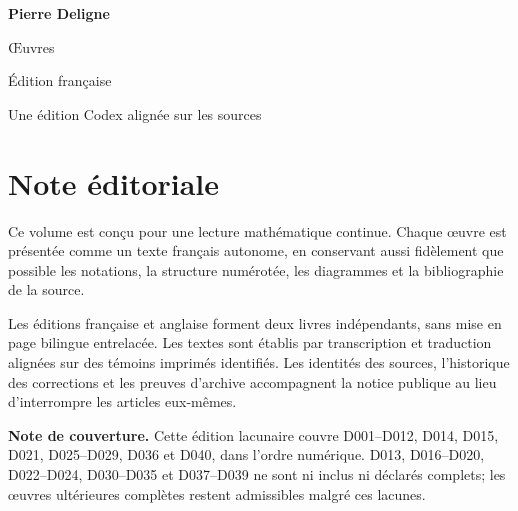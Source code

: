 \documentclass[11pt,a4paper]{article}
\begin{document}
\begin{titlepage}
  \pagecolor{DeligneBlue}
  \color{white}
  \vspace*{34mm}
  {\fontsize{30}{36}\selectfont\bfseries Pierre Deligne\par}
  \vspace{7mm}
  {\fontsize{18}{23}\selectfont Œuvres\par}
  \vspace{4mm}
  {\large Édition française\par}
  \vfill
  {\normalsize Une édition Codex alignée sur les sources\par}
\end{titlepage}
\setcounter{page}{2}
\nopagecolor
\color{DeligneInk}
\section*{Note éditoriale}
Ce volume est conçu pour une lecture mathématique continue. Chaque œuvre est présentée comme un texte français autonome, en conservant aussi fidèlement que possible les notations, la structure numérotée, les diagrammes et la bibliographie de la source.

Les éditions française et anglaise forment deux livres indépendants, sans mise en page bilingue entrelacée. Les textes sont établis par transcription et traduction alignées sur des témoins imprimés identifiés. Les identités des sources, l'historique des corrections et les preuves d'archive accompagnent la notice publique au lieu d'interrompre les articles eux-mêmes.

\textbf{Note de couverture.} Cette édition lacunaire couvre D001--D012, D014, D015, D021, D025--D029, D036 et D040, dans l'ordre numérique. D013, D016--D020, D022--D024, D030--D035 et D037--D039 ne sont ni inclus ni déclarés complets; les œuvres ultérieures complètes restent admissibles malgré ces lacunes.
\end{document}

